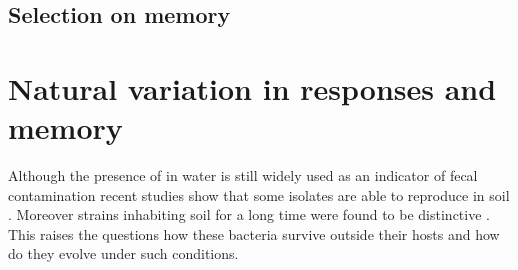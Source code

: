 \subsection{Selection on memory}



\section{Natural variation in responses and memory}
Although the presence of  in water is still widely used as an indicator of fecal contamination recent studies show that some  isolates are able to  reproduce in soil \cite{byappanahalli2004indigenous, somorin2016general}.
Moreover strains inhabiting soil for a long time were found to be distinctive \cite{walk2009cryptic, walk2015cryptic}.
This raises the questions how these bacteria survive outside their hosts and how do they evolve under such conditions.


\cleardoublepage

